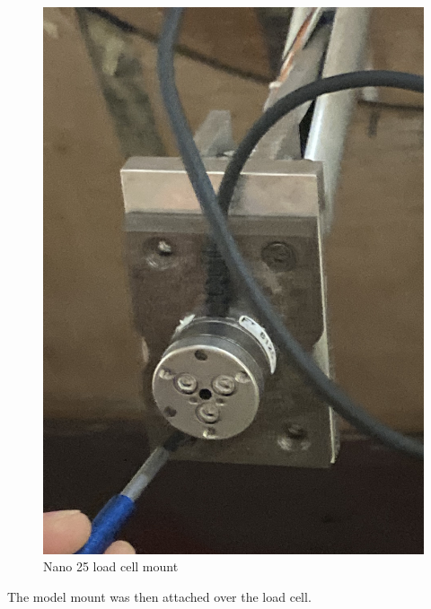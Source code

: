 \begin{figure}[H]
    \centering
    \includegraphics[scale=0.08]{04_Methodology/Figs/loadCellMount}
    \caption{Nano 25 load cell mount}
    \label{fig:LoadCella}
\end{figure}

The model mount was then attached over the load cell. 


